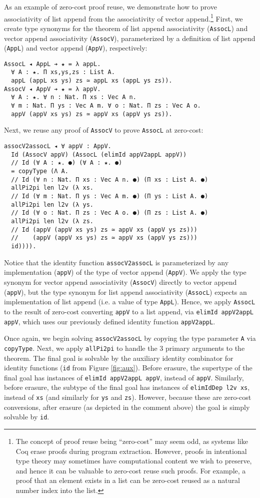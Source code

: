 \documentclass[acmsmall]{acmart}\settopmatter{}
\newcommand{\reffig}[1]{Figure \ref{fig:#1}}
\begin{document}
As an example of zero-cost proof reuse, we demonstrate how to prove
associativity of list append from the associativity of vector
append.\footnote{
  The concept of proof reuse being ``zero-cost'' may seem odd,
  as systems like Coq erase proofs during program
  extraction. However, proofs in intentional type theory may sometimes
  have computational content we wish to preserve,
  and hence it can be valuable to zero-cost reuse such proofs. For
  example, a proof that an element exists in a list can be zero-cost
  reused as a natural number index into the list.
}
First, we create type synonyms for the theorem of list append
associativity (\verb;AssocL;) and vector append associativity
(\verb;AssocV;), parameterized by a definition of list append
(\verb;AppL;) and vector append (\verb;AppV;), respectively:
\begin{verbatim}
AssocL ◂ AppL ➔ ★ = λ appL.
  ∀ A : ★. Π xs,ys,zs : List A.  
  appL (appL xs ys) zs ≃ appL xs (appL ys zs)).
AssocV ◂ AppV ➔ ★ = λ appV.
  ∀ A : ★. ∀ n : Nat. Π xs : Vec A n.
  ∀ m : Nat. Π ys : Vec A m. ∀ o : Nat. Π zs : Vec A o.
  appV (appV xs ys) zs ≃ appV xs (appV ys zs)).
\end{verbatim}
Next, we reuse any proof of \verb;AssocV; to prove
\verb;AssocL; at zero-cost:
\begin{verbatim}
assocV2assocL ◂ ∀ appV : AppV.
  Id (AssocV appV) (AssocL (elimId appV2appL appV))
  // Id (∀ A : ★. ●) (∀ A : ★. ●)
  = copyType (Λ A.
  // Id (∀ n : Nat. Π xs : Vec A n. ●) (Π xs : List A. ●)
  allPi2pi len l2v (λ xs.
  // Id (∀ m : Nat. Π ys : Vec A m. ●) (Π ys : List A. ●)
  allPi2pi len l2v (λ ys.
  // Id (∀ o : Nat. Π zs : Vec A o. ●) (Π zs : List A. ●)
  allPi2pi len l2v (λ zs.
  // Id (appV (appV xs ys) zs ≃ appV xs (appV ys zs)))
  //    (appV (appV xs ys) zs ≃ appV xs (appV ys zs)))
  id)))).
\end{verbatim}
Notice that the identity function \verb;assocV2assocL; is parameterized
by any implementation (\verb;appV;) of the type of vector append
(\verb;AppV;). We apply the type synonym for vector append associativity
(\verb;AssocV;) directly to vector append (\verb;appV;), but the type
synonym for list append associativity (\verb;AssocL;) expects an
implementation of list append (i.e. a value of type
\verb;AppL;). Hence, we apply \verb;AssocL; to the result of
zero-cost converting \verb;appV; to a list append, via
\verb;elimId appV2appL appV;, which uses our
previously defined identity function \verb;appV2appL;.

Once again, we begin solving \verb;assocV2assocL; by copying the type
parameter \verb;A; via \verb;copyType;. Next, we apply \verb;allPi2pi;
to handle the 3 primary arguments to the theorem. The final goal is
solvable by the auxiliary identity combinator for identity functions
(\verb;id; from \reffig{aux}). Before erasure, the supertype of the
final goal has instances of \verb;elimId appV2appL appV;, instead of
\verb;appV;. Similarly, before erasure, the subtype of the final goal has instances
of \verb;elimIdDep l2v xs;, instead of \verb;xs; (and similarly for
\verb;ys; and \verb;zs;).  However, because these are zero-cost
conversions, after erasure (as depicted in the comment above) the goal
is simply solvable by \verb;id;.
\end{document}
